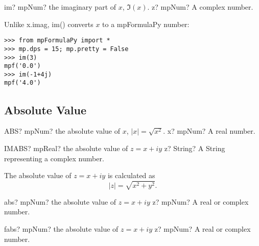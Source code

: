 \vspace{0.6cm}

\begin{mpFunctionsExtract}
	\mpFunctionOne
	{im? mpNum? the imaginary part of $x$, $\Im(x)$.}
	{z? mpNum? A complex number.}
\end{mpFunctionsExtract}

Unlike x.imag, im() converts  $x$ to a mpFormulaPy number:

\begin{lstlisting}
>>> from mpFormulaPy import *
>>> mp.dps = 15; mp.pretty = False
>>> im(3)
mpf('0.0')
>>> im(-1+4j)
mpf('4.0')
\end{lstlisting}



\subsection{Absolute Value}

\begin{mpFunctionsExtract}
	\mpWorksheetFunctionOneNotImplemented
	{ABS? mpNum? the absolute value of $x$, $|x| = \sqrt{x^2}$.}
	{x? mpNum? A real number.}
\end{mpFunctionsExtract}


\vspace{0.6cm}

\begin{mpFunctionsExtract}
	\mpWorksheetFunctionOneNotImplemented
	{IMABS? mpReal? the absolute value of $z=x+iy$}
	{z? String? A String representing a complex number.}
\end{mpFunctionsExtract}

\vspace{0.3cm}
The absolute value of $z=x+iy$ is calculated as
\begin{equation}
|z|=\sqrt{x^2+y^2}.
\end{equation}

\vspace{0.6cm}

\begin{mpFunctionsExtract}
	\mpFunctionOne
	{abs? mpNum? the absolute value of $z=x+iy$}
	{z? mpNum? A real or complex number.}
\end{mpFunctionsExtract}



\vspace{0.6cm}

\begin{mpFunctionsExtract}
	\mpFunctionOne
	{fabs? mpNum? the absolute value of $z=x+iy$}
	{z? mpNum? A real or complex number.}
\end{mpFunctionsExtract}


